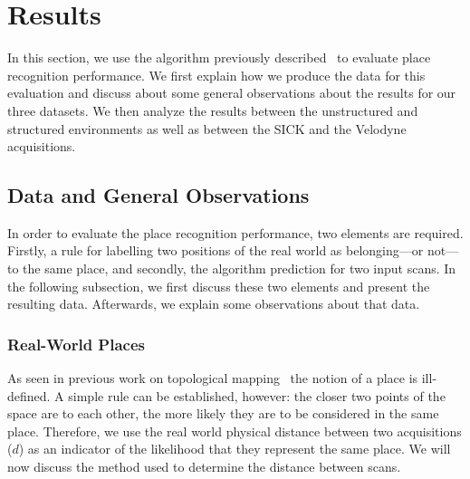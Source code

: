 \section{Results}
\label{sec:chap_slam_results}


In this section, we use the algorithm previously described~\citep{Steder2011b} to evaluate place recognition performance. We first explain how we produce the data for this evaluation and discuss about some general observations about the results for our three datasets. We then analyze the results between the unstructured and structured environments as well as between the SICK and the Velodyne acquisitions. 

\subsection{Data and General Observations}
\label{ssec:chap_slam_performance_evaluation}

In order to evaluate the place recognition performance, two elements are required. Firstly, a rule for labelling two positions of the real world as belonging---or not---to the same place, and secondly, the algorithm prediction for two input scans. In the following subsection, we first discuss these two elements and present the resulting data. Afterwards, we explain some observations about that data.


\subsubsection{Real-World Places}
As seen in previous work on topological mapping~\citep{Valgren2008, Brunskill2007} the notion of a place is ill-defined. A simple rule can be established, however: the closer two points of the space are to each other, the more likely they are to be considered in the same place. Therefore, we use the real world physical distance between two acquisitions ($d$) as an indicator of the likelihood that they represent the same place. We will now discuss the method used to determine the distance between scans. 

